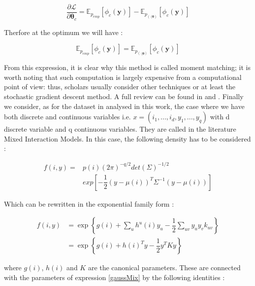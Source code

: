 \documentclass[12pt,%
               a4paper,%
               oneside,openany,%
               titlepage,%
               headinclude,footinclude,%
               BCOR5mm,%
               cleardoublepage=empty,%
               tablecaptionabove,%
               floatperchapter,
               ]{scrreprt}                 %
\begin{document}
\begin{equation}
\frac{\partial\mathcal{L}}{\partial\boldsymbol{\theta}_{c}}=\mathbb{E}_{p_{emp}}\left[\phi_{c}(\textbf{y})\right]-\mathbb{E}_{p_{(\cdot|\boldsymbol{\theta})}}\left[\phi_{c}(\textbf{y})\right]
\end{equation}

Therfore at the optimum we will have \cite{murphy2012machine}:

\begin{equation}
\mathbb{E}_{p_{emp}}\left[\phi_{c}(\textbf{y})\right]=\mathbb{E}_{p_{(\cdot|\boldsymbol{\theta})}}\left[\phi_{c}(\textbf{y})\right]
\end{equation}

From this expression, it is clear why this method is called moment matching; it is worth noting that such computation is largely expensive from a computational point of view: thus, scholars usually consider other techniques or at least the stochastic gradient descent method. A full review can be found in \cite{murphy2012machine} and \cite{koller2009probabilistic}. Finally we consider, as for the dataset in analysed in this work, the case where we have both discrete and continuous variables i.e. $x=\left(i_{1},...,i_{d},y_{1},...,y_{q} \right)$ with d discrete variable and q continuous variables. They are called in the literature Mixed Interaction Models. In this case, the following density has to be considered \cite{hojsgaard2012graphical}:

\begin{equation}
\begin{split}
f(i,y)=& p(i)(2\pi)^{-q/2}det(\Sigma)^{-1/2} \\
& exp\left[-\dfrac{1}{2}\left(y-\mu(i)\right)^{T}\Sigma^{-1}\left(y-\mu(i)\right)\right]
\end{split}
\label{gaussMix}
\end{equation}

Which can be rewritten in the exponential family form \cite{hojsgaard2012graphical}: 

\begin{equation}
\begin{split}
f(i,y) & = \exp\left\lbrace g(i)+\sum_{u}h^{u}(i)y_{u}-\dfrac{1}{2}\sum_{uv} y_{u}y_{v}k_{uv}\right\rbrace \\
&= \exp\left\lbrace g(i)+h(i)^{T}y-\dfrac{1}{2}y^{T}Ky \right\rbrace
\end{split}
\end{equation}

where $g(i)$, $h(i)$ and $K$ are the canonical parameters. These are connected with the parameters of expression \ref{gaussMix} by the following identities \cite{hojsgaard2012graphical}: 
\end{document}
